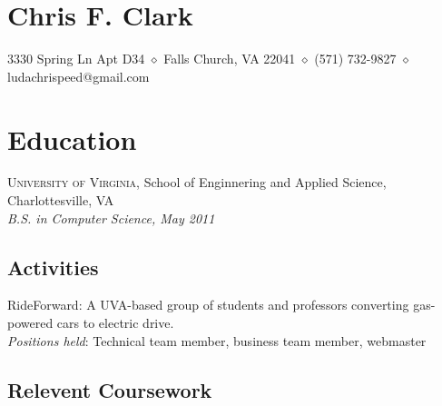 \documentclass[a4paper]{article}
\begin{document}

\section*{\LARGE Chris F. Clark}
\vskip -5pt 

3330 Spring Ln Apt D34 $\diamond$ Falls Church, VA 22041 $\diamond$ (571)
732-9827 $\diamond$ ludachrispeed@gmail.com

\section*{Education}

  \textsc{University of Virginia}, School of Enginnering and Applied
  Science, Charlottesville, VA \\
  \textsl{B.S. in Computer Science, May 2011}

  \subsection*{Activities}

  RideForward: A UVA-based group of students and professors converting gas-powered cars
    to electric drive. \\ 
  \textsl{Positions held}: Technical team member, business team member, webmaster

  \subsection*{Relevent Coursework}
\end{document}
